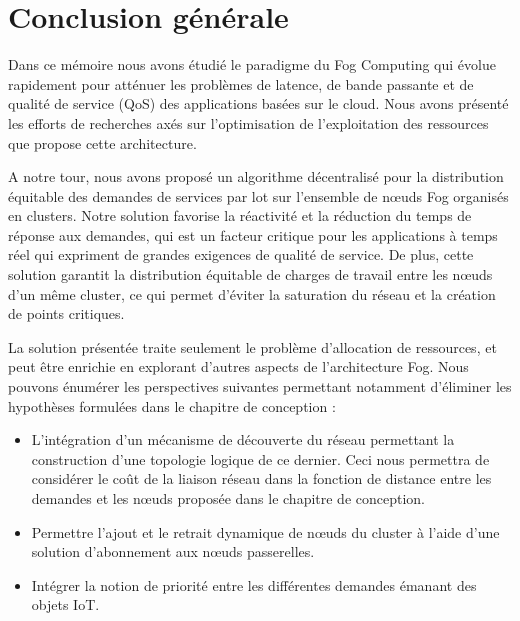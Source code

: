 \chapter{Conclusion générale}
Dans ce mémoire nous avons étudié le paradigme du Fog Computing qui évolue rapidement pour atténuer les problèmes de latence, de bande passante et de qualité de service (QoS) des applications basées sur le cloud. Nous avons présenté les efforts de recherches axés sur l'optimisation de l'exploitation des ressources que propose cette architecture.\par
A notre tour, nous avons proposé un algorithme décentralisé pour la distribution équitable des demandes de services par lot sur l'ensemble de nœuds Fog organisés en clusters. Notre solution favorise la réactivité et la réduction du temps de réponse aux demandes, qui est un facteur critique pour les applications à temps réel qui expriment de grandes exigences de qualité de service. De plus, cette solution garantit la distribution équitable de charges de travail entre les nœuds d'un même cluster, ce qui permet d'éviter la saturation du réseau et la création de points critiques.\par
La solution présentée traite seulement le problème d'allocation de ressources, et peut être enrichie en explorant d'autres aspects de l'architecture Fog. Nous pouvons énumérer les perspectives suivantes permettant notamment d'éliminer les hypothèses formulées dans le chapitre de conception :
\begin{itemize}
  \item L'intégration d'un mécanisme de découverte du réseau permettant la construction d'une topologie logique de ce dernier. Ceci nous permettra de considérer le coût de la liaison réseau dans la fonction de distance entre les demandes et les nœuds proposée dans le chapitre de conception.
  \item Permettre l'ajout et le retrait dynamique de nœuds du cluster à l'aide d'une solution d'abonnement aux nœuds passerelles.
  \item Intégrer la notion de priorité entre les différentes demandes émanant des objets IoT. 
\end{itemize}